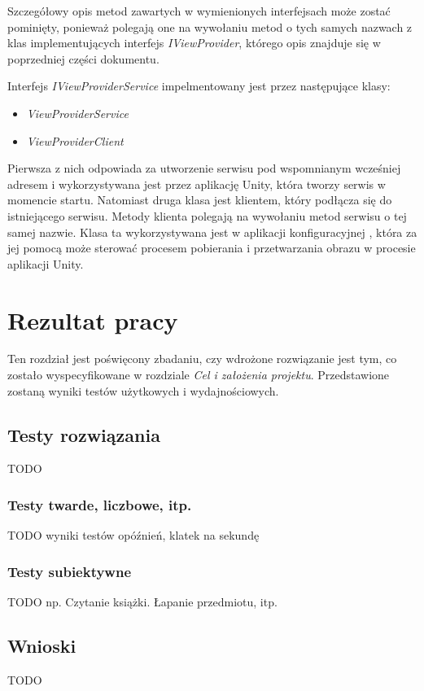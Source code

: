 \documentclass[a4paper,11pt,twoside]{report}
\theoremstyle{definition}
\begin{document}
Szczegółowy opis metod zawartych w wymienionych interfejsach może zostać pominięty, ponieważ polegają one na wywołaniu metod o tych samych nazwach z klas implementujących interfejs \textit{IViewProvider}, którego opis znajduje się w poprzedniej części dokumentu.

Interfejs \textit{IViewProviderService} impelmentowany jest przez następujące klasy:

\begin{itemize}
\item \textit{ViewProviderService}
\item \textit{ViewProviderClient}
\end{itemize}

Pierwsza z nich odpowiada za utworzenie serwisu pod wspomnianym wcześniej adresem i wykorzystywana jest przez aplikację Unity, która tworzy serwis w momencie startu.
Natomiast druga klasa jest klientem, który podłącza się do istniejącego serwisu. Metody klienta polegają na wywołaniu metod serwisu o tej samej nazwie. Klasa ta wykorzystywana jest w aplikacji konfiguracyjnej , która za jej pomocą  może sterować procesem pobierania i przetwarzania obrazu w procesie aplikacji Unity.

 

\chapter {Rezultat pracy}

Ten rozdział jest poświęcony zbadaniu, czy wdrożone rozwiązanie jest tym, co zostało wyspecyfikowane w rozdziale \textit{Cel i założenia projektu}. Przedstawione zostaną wyniki testów użytkowych i wydajnościowych.
\section {Testy rozwiązania}
TODO

\subsection {Testy twarde, liczbowe, itp.}
TODO wyniki testów opóźnień, klatek na sekundę

\subsection {Testy subiektywne}
TODO np. Czytanie książki. Łapanie przedmiotu, itp.

\section {Wnioski}
TODO 
\end{document}
